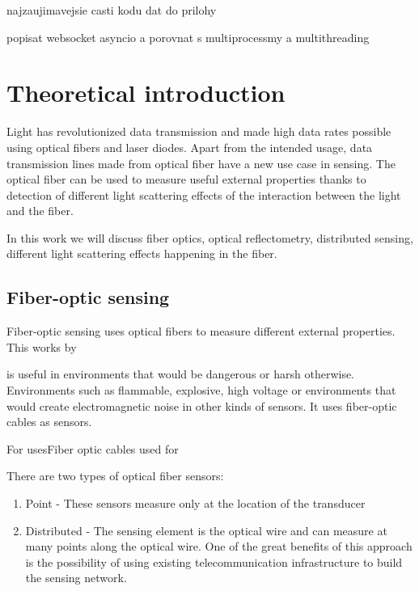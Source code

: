 
najzaujimavejsie casti kodu
dat do prilohy


popisat websocket
asyncio a porovnat s multiprocessmy a multithreading


\chapter{Theoretical introduction}


Light has revolutionized data transmission and made high data rates possible using optical fibers and laser diodes. Apart from the intended usage, data transmission lines made from optical fiber have a new use case in sensing. The optical fiber can be used to measure useful external properties thanks to detection of different light scattering effects of the interaction between the light and the fiber.

In this work we will discuss fiber optics, optical reflectometry, distributed sensing, different light scattering effects happening in the fiber.

\cite{dasKislov}



\cite{DVSShanFu}


\section{Fiber-optic sensing}

Fiber-optic sensing uses optical fibers to measure different external properties. This works by 

is useful in environments that would be dangerous or harsh otherwise. Environments such as flammable, explosive, high voltage or environments that would create electromagnetic noise in other kinds of sensors. It uses fiber-optic cables as sensors.


For usesFiber optic cables used for 



There are two types of optical fiber sensors:
\begin{enumerate}
    \item Point - These sensors measure only at the location of the transducer
    \item Distributed - The sensing element is the optical wire and can measure at many points along the optical wire. One of the great benefits of this approach is the possibility of using existing telecommunication infrastructure to build the sensing network.
\end{enumerate}

